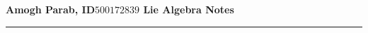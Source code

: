 \documentclass[11pt]{amsart}
\newcommand{\makeheading}[1]%
        {\hspace*{-\marginparsep minus \marginparwidth}%
         \begin{minipage}[t]{\textwidth}%
                {\large \bfseries #1}\\[-0.15\baselineskip]%
                 \rule{\columnwidth}{1pt}%
         \end{minipage}}
\begin{document}
\makeheading{Amogh Parab, ID$500172839$ \hfill Lie Algebra Notes}
\bigskip











%

%

\printbibliography
\end{document}
